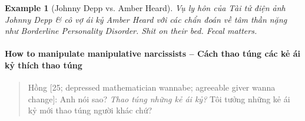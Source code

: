 \documentclass[12pt]{article}
\newtheorem{example}{Example}
\begin{document}
\begin{example}[{\sc Johnny Depp} vs. Amber Heard]
	Vụ ly hôn của Tài tử điện ảnh {\sc Johnny Depp} \& cô vợ ái kỷ Amber Heard với các chẩn đoán về tâm thần nặng như Borderline Personality Disorder. Shit on their bed. Fecal matters.
\end{example}

\paragraph{How to manipulate manipulative narcissists -- Cách thao túng các kẻ ái kỷ thích thao túng}

\begin{quote}
	{\sf Hồng [25; depressed mathematician wannabe; agreeable giver wanna change]}: Anh nói sao? {\it Thao túng những kẻ ái kỷ?} Tôi tưởng những kẻ ái kỷ mới thao túng người khác chứ?
	

\end{quote}
\end{document}
